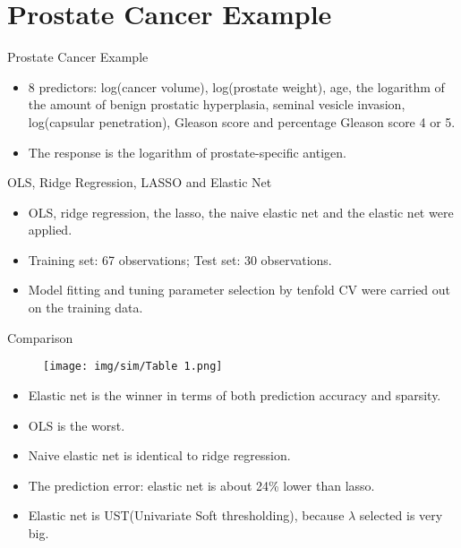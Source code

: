 
\section{Prostate Cancer Example}

    \begin{frame}{Prostate Cancer Example}
        \begin{itemize}
            \item 8 predictors: log(cancer volume), log(prostate weight), age, the logarithm of the amount of benign prostatic hyperplasia, seminal vesicle invasion, log(capsular penetration), Gleason score and percentage Gleason score 4 or 5.
            \item The response is the logarithm of prostate-specific antigen.
        \end{itemize}
        
    \end{frame}

    \begin{frame}{OLS, Ridge Regression, LASSO and Elastic Net}
        \begin{itemize}
            \item OLS, ridge regression, the lasso, the naive elastic net and the elastic net were applied.
            \item Training set: 67 observations; Test set: 30 observations.
            \item Model fitting and tuning parameter selection by tenfold CV were carried out on the training data.
        \end{itemize}
    \end{frame}

    \begin{frame}{Comparison}
        \begin{figure}
            \centering
            \texttt{[image: img/sim/Table 1.png]}
        \end{figure}
        \begin{itemize}
            \item Elastic net is the winner in terms of both prediction accuracy and sparsity.
            \item OLS is the worst.
            \item Naive elastic net is identical to ridge regression.
            \item The prediction error: elastic net is about 24\% lower than lasso.
            \item Elastic net is UST(Univariate Soft thresholding), because $\lambda$ selected is very big.
        \end{itemize}
    \end{frame}
